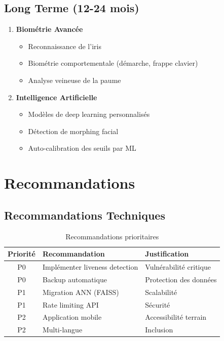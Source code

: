\documentclass[12pt,a4paper]{report}
\begin{document}
\subsection{Long Terme (12-24 mois)}

\begin{enumerate}
    \item \textbf{Biométrie Avancée}
    \begin{itemize}
        \item Reconnaissance de l'iris
        \item Biométrie comportementale (démarche, frappe clavier)
        \item Analyse veineuse de la paume
    \end{itemize}
    
    \item \textbf{Intelligence Artificielle}
    \begin{itemize}
        \item Modèles de deep learning personnalisés
        \item Détection de morphing facial
        \item Auto-calibration des seuils par ML
    \end{itemize}
\end{enumerate}

\section{Recommandations}

\subsection{Recommandations Techniques}

\begin{table}[H]
    \centering
    \caption{Recommandations prioritaires}
    \label{tab:recommendations}
    \begin{tabular}{|c|p{5cm}|p{5cm}|}
        \hline
        \textbf{Priorité} & \textbf{Recommandation} & \textbf{Justification} \\
        \hline
        P0 & Implémenter liveness detection & Vulnérabilité critique \\
        \hline
        P0 & Backup automatique & Protection des données \\
        \hline
        P1 & Migration ANN (FAISS) & Scalabilité \\
        \hline
        P1 & Rate limiting API & Sécurité \\
        \hline
        P2 & Application mobile & Accessibilité terrain \\
        \hline
        P2 & Multi-langue & Inclusion \\
        \hline
    \end{tabular}
\end{table}
\end{document}
